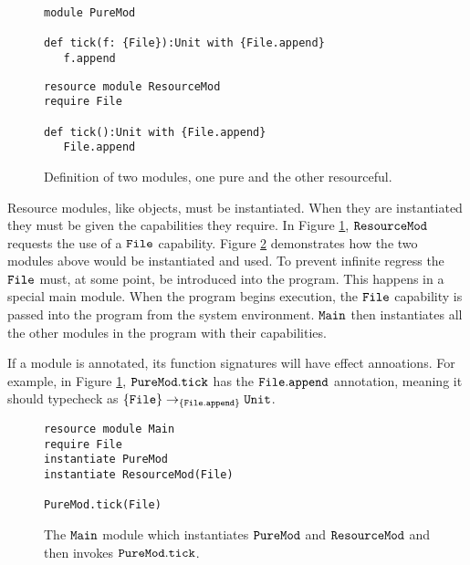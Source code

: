 \begin{figure}[h]

\begin{lstlisting}
module PureMod

def tick(f: {File}):Unit with {File.append}
   f.append

\end{lstlisting}

\begin{lstlisting}
resource module ResourceMod
require File

def tick():Unit with {File.append}
   File.append
\end{lstlisting}

\caption{Definition of two modules, one pure and the other resourceful.}
\label{fig:wyv_modules}
\end{figure}

Resource modules, like objects, must be instantiated. When they are instantiated they must be given the capabilities they require. In Figure \ref{fig:wyv_modules}, $\mathtt{ResourceMod}$ requests the use of a $\mathtt{File}$ capability. Figure \ref{fig:wyv_module_instantiation} demonstrates how the two modules above would be instantiated and used. To prevent infinite regress the $\mathtt{File}$ must, at some point, be introduced into the program. This happens in a special main module. When the program begins execution, the $\mathtt{File}$ capability is passed into the program from the system environment. $\mathtt{Main}$ then instantiates all the other modules in the program with their capabilities.

If a module is annotated, its function signatures will have effect annoations. For example, in Figure \ref{fig:wyv_modules}, $\mathtt{PureMod.tick}$ has the $\mathtt{File.append}$ annotation, meaning it should typecheck as $\mathtt{ \{ File \} \rightarrow_{\{\mathtt{File.append}\}} \mathtt{Unit} }$. 


\begin{figure}[h]

\begin{lstlisting}
resource module Main
require File
instantiate PureMod
instantiate ResourceMod(File)

PureMod.tick(File)
\end{lstlisting}

\caption{The $\mathtt{Main}$ module which instantiates $\mathtt{PureMod}$ and $\mathtt{ResourceMod}$ and then invokes $\mathtt{PureMod.tick}$.}
\label{fig:wyv_module_instantiation}
\end{figure}

